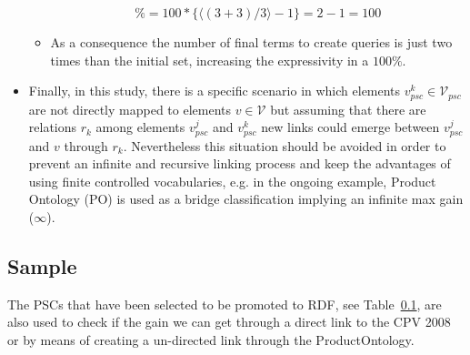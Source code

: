 \begin{itemize}
\begin{itemize}
  \begin{equation}
      \% = 100 * \{ \langle (3+3) / 3 \rangle -1 \} = 2-1 = 100 
  \end{equation}
      \item As a consequence the number of final terms to create queries is just two times than the initial set, increasing the expressivity in a $100\%$.
  \end{itemize}

 \item Finally, in this study, there is a specific scenario in which elements $v^k_{psc} \in \mathcal{V}_{psc}$ are not directly mapped to elements $v \in \mathcal{V}$ but 
 assuming that there are relations $r_k$  among elements $v^j_{psc}$  and $v^k_{psc}$ new links could emerge between $v^j_{psc}$ and $v$ through $r_k$. Nevertheless this 
 situation should be avoided in order to prevent an infinite and recursive linking process and keep the advantages of using finite controlled vocabularies, 
 e.g. in the ongoing example, Product Ontology (PO) is used as a bridge classification implying an infinite max gain ($\infty$).
 
\end{itemize}

\subsection{Sample}
The PSCs that have been selected to be promoted to RDF, see Table~\ref{}, are also used to check if the gain we can get through a direct link to the CPV 2008 or 
by means of creating a un-directed link through the ProductOntology.

